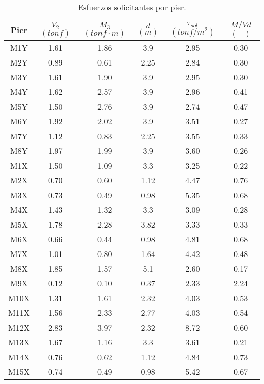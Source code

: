 \begin{table}[H]
  \centering
  \caption{Esfuerzos solicitantes por pier.}
  \begin{tabular}{cccccc}
    \hline
    \textbf{Pier} & \boldmath{}\textbf{$V_2 $ $ (tonf)$}\unboldmath{} & \boldmath{}\textbf{$M_3 $$(tonf \cdot m)$}\unboldmath{} & \boldmath{}\textbf{$d $$ (m)$}\unboldmath{} & \boldmath{}\textbf{$\tau_{sol} $$ (tonf/m^2)$}\unboldmath{} & \boldmath{}\textbf{$M/Vd$$ (-)$}\unboldmath{} \bigstrut\\
    \hline
    M1Y   & 1.61  & 1.86  & 3.9   & 2.95  & 0.30 \bigstrut[t]\\
    M2Y   & 0.89  & 0.61  & 2.25  & 2.84  & 0.30 \\
    M3Y   & 1.61  & 1.90  & 3.9   & 2.95  & 0.30 \\
    M4Y   & 1.62  & 2.57  & 3.9   & 2.96  & 0.41 \\
    M5Y   & 1.50  & 2.76  & 3.9   & 2.74  & 0.47 \\
    M6Y   & 1.92  & 2.02  & 3.9   & 3.51  & 0.27 \\
    M7Y   & 1.12  & 0.83  & 2.25  & 3.55  & 0.33 \\
    M8Y   & 1.97  & 1.99  & 3.9   & 3.60  & 0.26 \\
    M1X   & 1.50  & 1.09  & 3.3   & 3.25  & 0.22 \\
    M2X   & 0.70  & 0.60  & 1.12  & 4.47  & 0.76 \\
    M3X   & 0.73  & 0.49  & 0.98  & 5.35  & 0.68 \\
    M4X   & 1.43  & 1.32  & 3.3   & 3.09  & 0.28 \\
    M5X   & 1.78  & 2.28  & 3.82  & 3.33  & 0.33 \\
    M6X   & 0.66  & 0.44  & 0.98  & 4.81  & 0.68 \\
    M7X   & 1.01  & 0.80  & 1.64  & 4.42  & 0.48 \\
    M8X   & 1.85  & 1.57  & 5.1   & 2.60  & 0.17 \\
    M9X   & 0.12  & 0.10  & 0.37  & 2.33  & 2.24 \\
    M10X  & 1.31  & 1.61  & 2.32  & 4.03  & 0.53 \\
    M11X  & 1.56  & 2.33  & 2.77  & 4.03  & 0.54 \\
    M12X  & 2.83  & 3.97  & 2.32  & 8.72  & 0.60 \\
    M13X  & 1.67  & 1.16  & 3.3   & 3.61  & 0.21 \\
    M14X  & 0.76  & 0.62  & 1.12  & 4.84  & 0.73 \\
    M15X  & 0.74  & 0.49  & 0.98  & 5.42  & 0.67 \\

\end{tabular}
\end{table}
